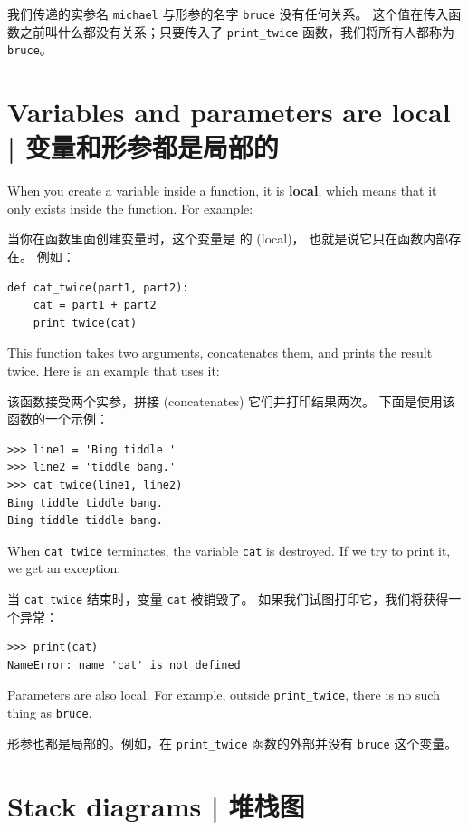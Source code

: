 我们传递的实参名 \lstinline{michael} 与形参的名字 \lstinline{bruce} 没有任何关系。 这个值在传入函数之前叫什么都没有关系；只要传入了 \lstinline{print_twice} 函数，我们将所有人都称为 \lstinline{bruce}。


%
\section{Variables and parameters are local  |  变量和形参都是局部的}
  
  

When you create a variable inside a function, it is {\bf local},
which means that it only
exists inside the function.  For example:

当你在函数里面创建变量时，这个变量是 的 (local)，
也就是说它只在函数内部存在。 例如：

\begin{lstlisting}
def cat_twice(part1, part2):
    cat = part1 + part2
    print_twice(cat)
\end{lstlisting}
%
This function takes two arguments, concatenates them, and prints
the result twice.  Here is an example that uses it:

该函数接受两个实参，拼接 (concatenates) 它们并打印结果两次。 下面是使用该函数的一个示例：

\begin{lstlisting}
>>> line1 = 'Bing tiddle '
>>> line2 = 'tiddle bang.'
>>> cat_twice(line1, line2)
Bing tiddle tiddle bang.
Bing tiddle tiddle bang.
\end{lstlisting}
%
When \verb"cat_twice" terminates, the variable {\tt cat}
is destroyed.  If we try to print it, we get an exception:
  

当 \lstinline{cat_twice} 结束时，变量 \lstinline{cat} 被销毁了。
如果我们试图打印它，我们将获得一个异常：

\begin{lstlisting}
>>> print(cat)
NameError: name 'cat' is not defined
\end{lstlisting}
%
Parameters are also local.
For example, outside \verb"print_twice", there is no
such thing as {\tt bruce}.

形参也都是局部的。例如，在 \lstinline{print_twice} 函数的外部并没有 \lstinline{bruce} 这个变量。


%
\section{Stack diagrams  |  堆栈图}
\label{stackdiagram}
    
    


